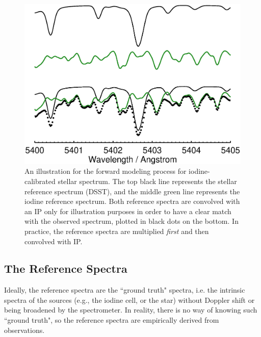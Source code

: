 \begin{figure}
\includegraphics[scale=0.6]{doppler/forward_modeling.eps}
\caption{An illustration for the forward modeling process for
  iodine-calibrated stellar spectrum. The top black line represents
  the stellar reference spectrum (DSST), and the middle green line
  represents the iodine reference spectrum. Both reference spectra are
  convolved with an IP only for illustration purposes in order to have
  a clear match with the observed spectrum, plotted in black dots on
  the bottom. In practice, the reference spectra are multiplied {\it
    first} and then convolved with IP. \label{doppler:fig:modeling}}
\end{figure}



\subsection{The Reference Spectra}

Ideally, the reference spectra are the ``ground truth" spectra,
i.e. the intrinsic spectra of the sources (e.g., the iodine cell, or
the star) without Doppler shift or being broadened by the
spectrometer. In reality, there is no way of knowing such ``ground
truth", so the reference spectra are empirically derived from
observations.

